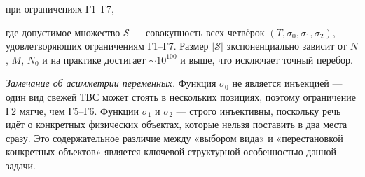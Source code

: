 \documentclass[12pt,a4paper]{article}
\begin{document}
при ограничениях Г1--Г7,

где допустимое множество $\mathcal{S}$ --- совокупность всех четвёрок $(T, \sigma_0, \sigma_1, \sigma_2)$, удовлетворяющих ограничениям Г1--Г7. Размер $|\mathcal{S}|$ экспоненциально зависит от $N$, $M$, $N_0$ и на практике достигает $\sim 10^{100}$ и выше, что исключает точный перебор.

\textit{Замечание об асимметрии переменных.} Функция $\sigma_0$ не является инъекцией --- один вид свежей ТВС может стоять в нескольких позициях, поэтому ограничение Г2 мягче, чем Г5--Г6. Функции $\sigma_1$ и $\sigma_2$ --- строго инъективны, поскольку речь идёт о конкретных физических объектах, которые нельзя поставить в два места сразу. Это содержательное различие между «выбором вида» и «перестановкой конкретных объектов» является ключевой структурной особенностью данной задачи.
\end{document}
